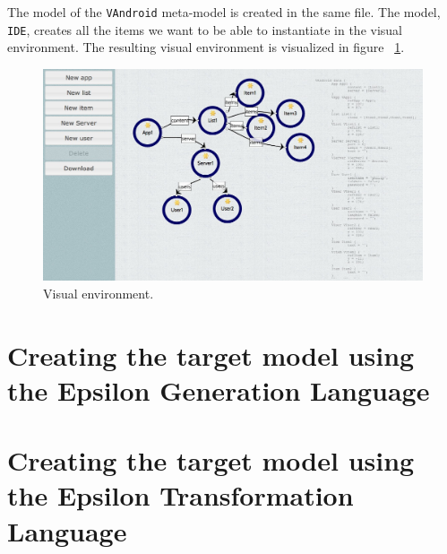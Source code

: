 The model of the \texttt{VAndroid} meta-model is created in the same file. The model, \texttt{IDE}, creates all the items we want to be able to instantiate in the visual environment. The resulting visual environment is visualized in figure ~\ref{fig:visual_environment}.
\begin{figure}[h!]
\centering
\includegraphics[width=1.0\textwidth]{images/app1_visual_environment.jpg}
\caption{Visual environment.}
\label{fig:visual_environment}
\end{figure}

\section{Creating the target model using the Epsilon Generation Language}

\section{Creating the target model using the Epsilon Transformation Language}

